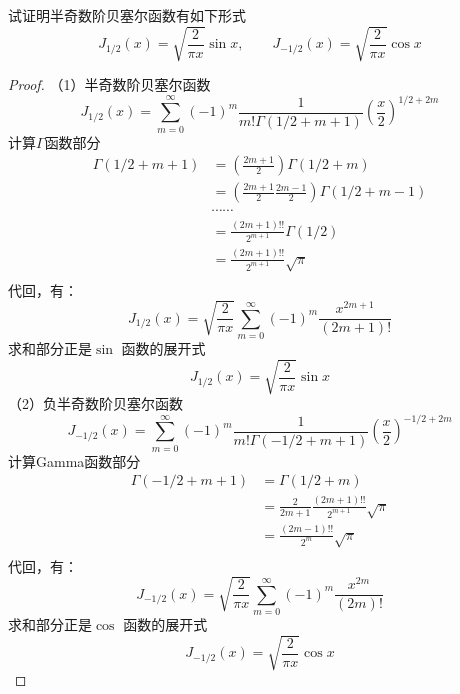  \begin{example}
	试证明半奇数阶贝塞尔函数有如下形式
	\begin{equation*}
		J_{1/2} (x) =\sqrt{\frac{2}{\pi x}} \sin x,  \qquad  J_{-1/2} (x) =\sqrt{\frac{2}{\pi x}} \cos x
	\end{equation*}
 \end{example}
  \begin{proof}
	（1）半奇数阶贝塞尔函数
	\begin{equation*}
		J_{1/2}(x) = \sum\limits_{m=0}^{\infty} (-1)^m  \frac{1}{m! \Gamma(1/2+m+1) } (\frac{x}{2})^{1/2+2m} 
	\end{equation*}	 
	计算$\Gamma$函数部分 
	\begin{equation*}
		\begin{split}
			\Gamma(1/2+m+1) &= (\frac{2m+1}{2}) \Gamma(1/2+m) \\
			& = (\frac{2m+1}{2}\frac{2m-1}{2})  \Gamma(1/2+m-1) \\
			&\cdots \cdots \\
			& = \frac{(2m+1)!!}{2^{m+1}} \Gamma(1/2) \\
			& = \frac{(2m+1)!!}{2^{m+1}} \sqrt{\pi} \\
		\end{split}	
	\end{equation*}	
	代回，有：
	\begin{equation*}
		J_{1/2}(x) = \sqrt{\frac{2}{\pi x}} \sum\limits_{m=0}^{\infty} (-1)^m  \frac{x^{2m+1}}{(2m+1)!} 
	\end{equation*}	 
	求和部分正是$ \sin $ 函数的展开式
	\begin{equation*}
		J_{1/2}(x) = \sqrt{\frac{2}{\pi x}} \sin x  
	\end{equation*}	 
	（2）负半奇数阶贝塞尔函数
	\begin{equation*}
		J_{-1/2}(x) = \sum\limits_{m=0}^{\infty} (-1)^m  \frac{1}{m! \Gamma(-1/2+m+1) } (\frac{x}{2})^{-1/2+2m} 
	\end{equation*}	
	计算Gamma函数部分 
		\begin{equation*}
			\begin{split}
				\Gamma(-1/2+m+1) &= \Gamma(1/2+m) \\
				& = \frac{2}{2m+1}\frac{(2m+1)!!}{2^{m+1}} \sqrt{\pi}  \\
				& =  \frac{(2m-1)!!}{2^m} \sqrt{\pi} \\
			\end{split}	
	\end{equation*}	
	代回，有：
	\begin{equation*}
		J_{-1/2}(x) = \sqrt{\frac{2}{\pi x}} \sum\limits_{m=0}^{\infty} (-1)^m  \frac{x^{2m}}{(2m)!} 
	\end{equation*}	 
	求和部分正是$ \cos $ 函数的展开式
	\begin{equation*}
		J_{-1/2}(x) = \sqrt{\frac{2}{\pi x}} \cos x  
	\end{equation*}	 
  \end{proof}
  



